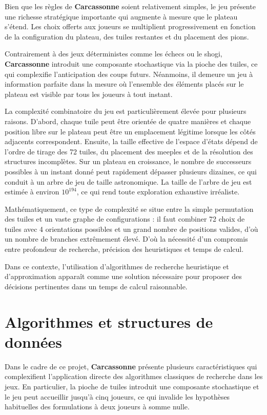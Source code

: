 \documentclass[11pt]{article}
\begin{document}
Bien que les règles de \textbf{Carcassonne} soient relativement simples, le jeu présente une richesse stratégique importante qui augmente à mesure que le plateau s'étend. 
Les choix offerts aux joueurs se multiplient progressivement en fonction de la configuration du plateau, des tuiles restantes et du placement des pions.

Contrairement à des jeux déterministes comme les échecs ou le shogi, \textbf{Carcassonne} introduit une composante stochastique via la pioche des tuiles, ce qui complexifie l'anticipation des coups futurs. 
Néanmoins, il demeure un jeu à information parfaite dans la mesure où l'ensemble des éléments placés sur le plateau est visible par tous les joueurs à tout instant.

La complexité combinatoire du jeu est particulièrement élevée pour plusieurs raisons. D'abord, chaque tuile peut être orientée de quatre manières et chaque position libre sur le plateau peut être un emplacement légitime lorsque les côtés adjacents correspondent. Ensuite, la taille effective de l'espace d'états dépend de l'ordre de tirage des 72 tuiles, du placement des meeples et de la résolution des structures incomplètes. Sur un plateau en croissance, le nombre de successeurs possibles à un instant donné peut rapidement dépasser plusieurs dizaines, ce qui conduit à un arbre de jeu de taille astronomique. La taille de l'arbre de jeu est estimée à environ $10^{194}$\cite{heyden2009implementing}, ce qui rend toute exploration exhaustive irréaliste.

Mathématiquement, ce type de complexité se situe entre la simple permutation des tuiles et un vaste graphe de configurations : il faut combiner 72 choix de tuiles avec 4 orientations possibles et un grand nombre de positions valides, d'où un nombre de branches extrêmement élevé. D'où la nécessité d'un compromis entre profondeur de recherche, précision des heuristiques et temps de calcul.

Dans ce contexte, l'utilisation d'algorithmes de recherche heuristique et d'approximation apparaît comme une solution nécessaire pour proposer des décisions pertinentes dans un temps de calcul raisonnable.



\section{Algorithmes et structures de données}

Dans le cadre de ce projet, \textbf{Carcassonne} présente plusieurs 
caractéristiques qui complexifient l'application directe des algorithmes 
classiques de recherche dans les jeux. En particulier, la pioche de 
tuiles introduit une composante stochastique et le jeu peut accueillir 
jusqu'à cinq joueurs, ce qui invalide les hypothèses habituelles des 
formulations à deux joueurs à somme nulle.
\end{document}
